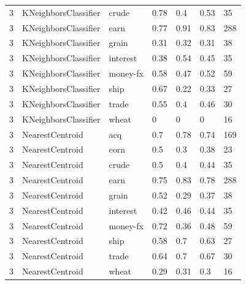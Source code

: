 \documentclass{article}
\begin{document}
\begin{table}[h]
\begin{tabular}{lllllll}
3             & KNeighborsClassifier   & crude           & 0.78               & 0.4             & 0.53              & 35               \\
3             & KNeighborsClassifier   & earn            & 0.77               & 0.91            & 0.83              & 288              \\
3             & KNeighborsClassifier   & grain           & 0.31               & 0.32            & 0.31              & 38               \\
3             & KNeighborsClassifier   & interest        & 0.38               & 0.54            & 0.45              & 35               \\
3             & KNeighborsClassifier   & money-fx        & 0.58               & 0.47            & 0.52              & 59               \\
3             & KNeighborsClassifier   & ship            & 0.67               & 0.22            & 0.33              & 27               \\
3             & KNeighborsClassifier   & trade           & 0.55               & 0.4             & 0.46              & 30               \\
3             & KNeighborsClassifier   & wheat           & 0                  & 0               & 0                 & 16               \\
3             & NearestCentroid        & acq             & 0.7                & 0.78            & 0.74              & 169              \\
3             & NearestCentroid        & corn            & 0.5                & 0.3             & 0.38              & 23               \\
3             & NearestCentroid        & crude           & 0.5                & 0.4             & 0.44              & 35               \\
3             & NearestCentroid        & earn            & 0.75               & 0.83            & 0.78              & 288              \\
3             & NearestCentroid        & grain           & 0.52               & 0.29            & 0.37              & 38               \\
3             & NearestCentroid        & interest        & 0.42               & 0.46            & 0.44              & 35               \\
3             & NearestCentroid        & money-fx        & 0.72               & 0.36            & 0.48              & 59               \\
3             & NearestCentroid        & ship            & 0.58               & 0.7             & 0.63              & 27               \\
3             & NearestCentroid        & trade           & 0.64               & 0.7             & 0.67              & 30               \\
3             & NearestCentroid        & wheat           & 0.29               & 0.31            & 0.3               & 16               \\\end{tabular}
\end{table}
\end{document}
